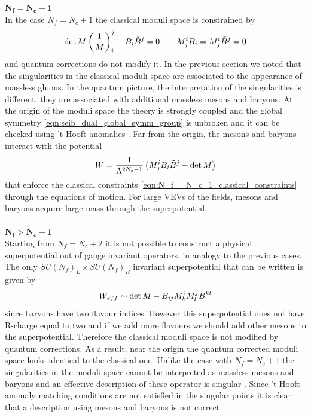 $\mathbf{N_f = N_c +1}$
\\
In the case $N_f = N_c +1 $ the classical moduli space is constrained by
\begin{equation}
 \mathrm{det } \,{M} \left( \frac{1}{M}\right)^j_i - B_i \tilde{B}^j = 0 \qquad
 M^i_j B_i = M^i_j \tilde{B}^j = 0 
 \label{eqn:N_f__N_c_1_classical_constraints}
\end{equation}
and quantum corrections do not modify it.
In the previous section we noted that the singularities in the classical moduli space are associated to the appearance of massless gluons.
In the quantum picture, the interpretation of the singularities is different: they are associated with additional massless mesons and baryons.
At the origin of the moduli space the theory is strongly coupled and the global symmetry \eqref{eqn:seib_dual_global_symm_group} is unbroken and it can be checked using 't Hooft anomalies \cite{Seiberg:1994bz}.
Far from the origin, the mesons and baryons interact with the potential 
\begin{equation}
W = \frac{1}{\Lambda^{2 N_c -1}} \left( M^i_j B_i \tilde{B}^j - \mathrm{det } \,{M} \right)
\end{equation}
that enforce the classical constraints \eqref{eqn:N_f__N_c_1_classical_constraints} through the equations of motion.
For large VEVs of the fields, mesons and baryons acquire large mass through the superpotential.
\\
\\
$\mathbf{ N_f > N_c +1 }$\\
Starting from $N_f = N_c +2$ it is not possible to construct a physical superpotential out of gauge invariant operators, in analogy to the previous cases.
The only $SU(N_f)_L \times SU(N_f)_R$ invariant superpotential that can be written is given by
\begin{equation}
 W_{eff} \sim \mathrm{det } \,{M} - B_{ij} M^i_k M^j_l \tilde{B}^{kl} 
 \end{equation} 
since baryons have two flavour indices.
However this superpotential does not have R-charge equal to two and if we add more flavours we should add other mesons to the superpotential. Therefore the classical moduli space is not modified by quantum corrections.
As a result, near the origin the quantum corrected moduli space looks identical to the classical one.
Unlike the case with $N_f = N_c +1$ the singularities in the moduli space cannot be interpreted as massless mesons and baryons and an effective description of these operator is singular \cite{Seiberg:1994bz}.
Since 't Hooft anomaly matching conditions are not satisfied in the singular points it is clear that a description using mesons and baryons is not correct.

